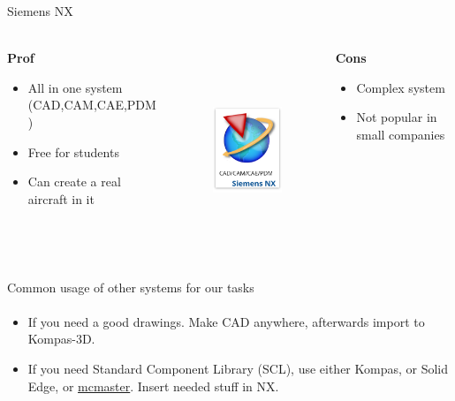 \documentclass[aspectratio=169]{beamer}
\begin{document}
\begin{frame}[t]{Siemens NX}
\framesubtitle{}
    \begin{columns}[T,onlytextwidth]
        \begin{column}{0.32\textwidth}
            \centering\textbf{Prof}
            \begin{itemize}
                \item All in one system (CAD,CAM,CAE,PDM)
                \item Free for students
                \item Can create a real aircraft in it
            \end{itemize}
        \end{column}
        \begin{column}{0.32\textwidth}
            \begin{figure}[H]
                \centering\includegraphics[height=6cm,width=1\textwidth,keepaspectratio]{resources/NXpic.png}
                \label{fig:resources/NXpic.png}
            \end{figure}
        \end{column}
        \begin{column}{0.32\textwidth}
            \centering\textbf{Cons}
            \begin{itemize}
                \item Complex system
                \item Not popular in small companies
            \end{itemize}
        \end{column}
    \end{columns}
\end{frame}

\begin{frame}[t]{Common usage of other systems for our tasks}
\framesubtitle{}
    \begin{itemize}
        \item If you need a good drawings. Make CAD anywhere, afterwards import to Kompas-3D.
        \item If you need Standard Component Library (SCL), use either Kompas, or Solid Edge, or \href{https://www.mcmaster.com/}{mcmaster}. Insert needed stuff in NX.
    \end{itemize}
\end{frame}
\end{document}
